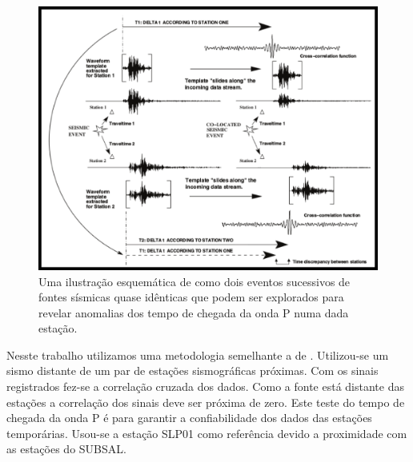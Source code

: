 \begin{figure}[!ht]
\centering
\includegraphics[scale=0.7]{Figs/correlacao_tempo_de_chegada.png}
\caption[Uma ilustração esquemática mostrando a correlação dos tempos de chegada da onda P.]{Uma ilustração esquemática de como dois eventos sucessivos de fontes sísmicas quase idênticas que podem ser explorados para revelar anomalias dos tempo de chegada da onda P numa dada estação. \citep{gibbons_identification_2006}}
\label{teste_tempo}
\end{figure}

Nesste trabalho utilizamos uma metodologia semelhante a de \cite{gibbons_identification_2006}. Utilizou-se um sismo distante de um par de estações sismográficas próximas. Com os sinais registrados fez-se a correlação cruzada dos dados. Como a fonte está distante das estações a correlação dos sinais deve ser próxima de zero. Este teste do tempo de chegada da onda P é para garantir a confiabilidade dos dados das estações temporárias. Usou-se a estação SLP01 como referência devido a proximidade com as estações do SUBSAL. 

